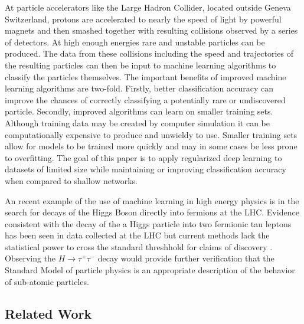 \documentclass[12pt,letterpaper]{article}
\begin{document}
At particle accelerators like the Large Hadron Collider, located outside Geneva Switzerland, protons are accelerated to nearly the speed of light by powerful magnets and then smashed together with resulting collisions observed by a series of detectors.  At high enough energies rare and unstable particles can be produced.  The data from these collisions including the speed and trajectories of the resulting particles can then be input to machine learning algorithms to classify the particles themselves.  The important benefits of improved machine learning algorithms are two-fold.  Firstly, better classification accuracy can improve the chances of correctly classifying a potentially rare or undiscovered particle.  Secondly, improved algorithms can learn on smaller training sets.  Although training data may be created by computer simulation it can be computationally expensive to produce and unwieldy to use.  Smaller training sets allow for models to be trained more quickly and may in some cases be less prone to overfitting.  The goal of this paper is to apply regularized deep learning to datasets of limited size while maintaining or improving classification accuracy when compared to shallow networks.

An recent example of the use of machine learning in high energy physics is in the search for decays of the Higgs Boson directly into fermions at the LHC.  Evidence consistent with the decay of the a Higgs particle into two fermionic tau leptons has been seen in data collected at the LHC but current methods lack the statistical power to cross the standard threshhold for claims of discovery \cite{pmlr-v42-cowa14}.  Observing the $H \rightarrow \tau^+ \tau^-$ decay would provide further verification that the Standard Model of particle physics is an appropriate description of the behavior of sub-atomic particles.

\subsection{Related Work}
\end{document}

